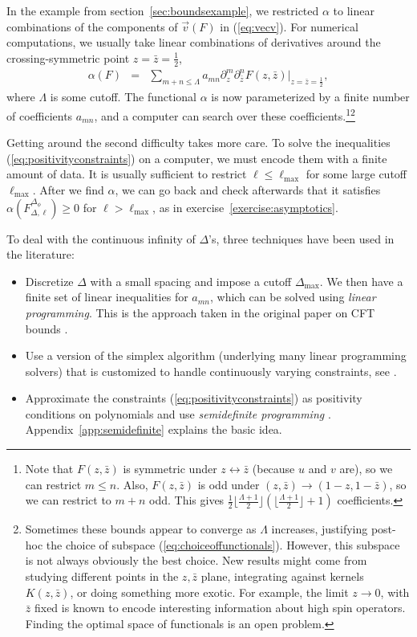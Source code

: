 \documentclass[11pt]{ws-rv9x6}
\newcommand\be{\begin{eqnarray}}
\newcommand\ee{\end{eqnarray}}
\newcommand\f\phi
\newcommand\ptl\partial
\newcommand\<\langle
\renewcommand\>\rangle
\renewcommand\.{\cdot}
\newcommand\De{\Delta}
\begin{document}
In the example from section~\ref{sec:boundsexample}, we restricted $\alpha$ to linear combinations of the components of $\vec v(F)$ in (\ref{eq:vecv}).  For numerical computations, we usually take linear combinations of derivatives around the crossing-symmetric point $z=\bar z = \frac 1 2$,
\be
\label{eq:choiceoffunctionals}
\alpha(F) &=& \sum_{m+n\leq \Lambda} a_{mn}\ptl_z^m \ptl_{\bar z}^n F(z,\bar z)|_{z=\bar z=\frac 1 2},
\ee
where $\Lambda$ is some cutoff.  The functional $\alpha$ is now parameterized by a finite number of coefficients $a_{mn}$, and a computer can search over these coefficients.\footnote{Note that $F(z,\bar z)$ is symmetric under $z\leftrightarrow \bar z$ (because $u$ and $v$ are), so we can restrict $m\leq n$.  Also, $F(z,\bar z)$ is odd under $(z,\bar z)\to (1-z,1-\bar z)$, so we can restrict to $m+n$ odd. This gives $\frac 1 2\lfloor \frac{\Lambda+1}{2}\rfloor(\lfloor \frac{\Lambda+1}{2}\rfloor+1)$ coefficients.}\footnote{Sometimes these bounds appear to converge as $\Lambda$ increases, justifying post-hoc the choice of subspace (\ref{eq:choiceoffunctionals}).  However, this subspace is not always obviously the best choice.  New results might come from studying different points in the $z,\bar z$ plane, integrating against kernels $K(z,\bar z)$, or doing something more exotic.  For example, the limit $z\to 0$, with $\bar z$ fixed is known to encode interesting information about high spin operators. Finding the optimal space of functionals is an open problem.}

Getting around the second difficulty takes more care.  To solve the inequalities (\ref{eq:positivityconstraints}) on a computer, we must encode them with a finite amount of data.  It is usually sufficient to restrict $\ell\leq \ell_\mathrm{max}$ for some large cutoff $\ell_\mathrm{max}$.  After we find $\alpha$, we can go back and check afterwards that it satisfies $\alpha(F_{\De,\ell}^{\De_\f})\geq 0$ for $\ell>\ell_\mathrm{max}$, as in exercise~\ref{exercise:asymptotics}.

To deal with the continuous infinity of $\De$'s, three techniques have been used in the literature:
\begin{itemize}
\item Discretize $\De$ with a small spacing and impose a cutoff $\De_\mathrm{max}$.  We then have a finite set of linear inequalities for $a_{mn}$, which can be solved using {\it linear programming}.  This is the approach taken in the original paper on CFT bounds \cite{Rattazzi:2008pe}.

\item Use a version of the simplex algorithm (underlying many linear programming solvers) that is customized to handle continuously varying constraints, see \cite{El-Showk:2014dwa,Paulos:2014vya}.

\item Approximate the constraints (\ref{eq:positivityconstraints}) as positivity conditions on polynomials and use {\it semidefinite programming} \cite{Poland:2011ey,Kos:2013tga,Kos:2014bka,Simmons-Duffin:2015qma}.  Appendix~\ref{app:semidefinite} explains the basic idea.

\end{itemize}
\end{document}
